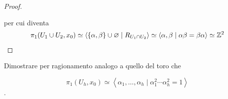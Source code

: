 \begin{proof}
\begin{figure}[h]
		\caption{}
		\label{fig:fundamental-group-torus-2}
	\end{figure}	
	per cui diventa
	\begin{equation*}
		\pi_1(U_1 \cup U_2, x_0) \simeq \left\langle \{\alpha, \beta\} \cup \varnothing \mid R_{U_1 \cap U_2} \right\rangle \simeq \left\langle \alpha, \beta \mid \alpha \beta = \beta \alpha \right\rangle \simeq \mathbb{Z}^2
	\end{equation*} 
\end{proof}

\begin{xca}
	Dimostrare per ragionamento analogo a quello del toro che 
	
	\begin{equation*}
		\pi_1(U_h, x_0) \simeq \left\langle \alpha_1, \dots, \alpha_h \mid \alpha^2_1 \cdots \alpha^2_h = 1\right\rangle
	\end{equation*}.
\end{xca}


